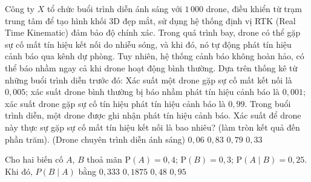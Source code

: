 \begin{ex}%
	Công ty $X$ tổ chức buổi trình diễn ánh sáng với $1\,000$ drone, điều khiển từ trạm trung tâm để tạo hình khối 3D đẹp mắt, sử dụng hệ thống định vị RTK (Real Time Kinematic) đảm bảo độ chính xác. Trong quá trình bay, drone có thể gặp sự cố mất tín hiệu kết nối do nhiễu sóng, và khi đó, nó tự động phát tín hiệu cảnh báo qua kênh dự phòng. Tuy nhiên, hệ thống cảnh báo không hoàn hảo, có thể báo nhầm ngay cả khi drone hoạt  động bình thường. Dựa trên thống kê từ những buổi trình diễn trước đó: Xác suất một drone gặp sự cố mất kết nối là $0{,}005$; xác suất drone bình thường bị báo nhầm phát tín hiệu cảnh báo là $0{,}001$; xác suất drone gặp sự cố tín hiệu phát tín hiệu cảnh báo là $0{,}99$. Trong buổi trình diễn, một drone được ghi nhận phát tín hiệu cảnh báo. Xác suất để drone này thực sự gặp sự cố mất tín hiệu kết nối là bao nhiêu? (làm tròn kết quả đến phần trăm).
	(Drone chuyên  trình diễn ánh sáng)
	 \choice
		 {$0{,}06$}
		{\True $0{,}83$} 
		 {$0{,}79$}
		 {$0{,}33$}
\end{ex}

\begin{ex}%
	Cho hai biến cố $A$, $B$ thoả mãn  $\mathrm{P}(A)=0{,}4$; $\mathrm{P}(B)=0{,}3$; $\mathrm{P}(A \mid B)=0{,}25$. Khi đó, $P(B\mid A)$ bằng
	\choice 
		{$0{,}333$} 
		 {\True $0{,}1875$}
		 {$0{,}48$}
		 {$0{,}95$}
\end{ex}



